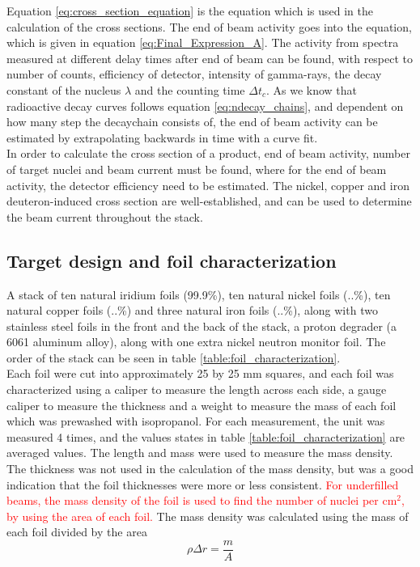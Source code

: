 \documentclass[a4paper,11pt,twoside]{book}
\begin{document}
\noindent 

\noindent 
Equation \ref{eq:cross_section_equation} is the equation which is used in the calculation of the cross sections. The end of beam activity goes into the equation, which is given in equation \ref{eq:Final_Expression_A}. The activity from spectra measured at different delay times after end of beam can be found, with respect to number of counts, efficiency of detector, intensity of gamma-rays, the decay constant of the nucleus $\lambda$ and the counting time $\Delta t_c$. As we know that radioactive decay curves follows equation \ref{eq:ndecay_chains}, and dependent on how many step the decaychain consists of, the end of beam activity can be estimated by extrapolating backwards in time with a curve fit. \\

\noindent 
In order to calculate the cross section of a product, end of beam activity, number of target nuclei and beam current must be found, where for the end of beam activity, the detector efficiency need to be estimated. 
The nickel, copper and iron deuteron-induced cross section are well-established, and can  be used to determine the beam current throughout the stack. 


\subsection{Target design and foil characterization}

A stack of ten natural iridium foils (99.9\%), ten natural nickel foils (..\%), ten natural copper foils (..\%) and three natural iron foils (..\%), along with two stainless steel foils in the front and the back of the stack, a proton degrader (a 6061 aluminum alloy), along with one extra nickel neutron monitor foil. The order of the stack can be seen in table \ref{table:foil_characterization}. \\

\noindent 
Each foil were cut into approximately 25 by 25 mm squares, and each foil was characterized using a caliper to measure the length across each side, a gauge caliper to measure the thickness and a weight to measure the mass of each foil which was prewashed with isopropanol. For each measurement, the unit was measured 4 times, and the values states in table \ref{table:foil_characterization} are averaged values. The length and mass were used to measure the mass density. The thickness was not used in the
calculation of the mass density, but was a good indication that the foil thicknesses were more or less consistent.
\textcolor{red}{For underfilled beams, the mass density of the foil is used to find the number of nuclei per cm$^2$, by using the area of each foil.} The mass density was calculated using the mass of each foil divided by the area
\begin{equation}
    \rho \Delta r = \frac{m}{A}
\end{equation}
\end{document}
